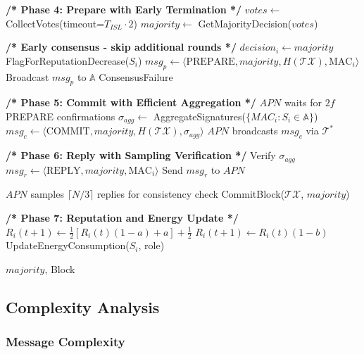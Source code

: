 \begin{algorithm}[H]
\begin{algorithmic}[1]
\Statex \textbf{/* Phase 4: Prepare with Early Termination */}
\State $votes \leftarrow$ CollectVotes(timeout=$T_{ISL} \cdot 2$)
\State $majority \leftarrow$ GetMajorityDecision($votes$)

    \State \textbf{/* Early consensus - skip additional rounds */}
            \State $decision_i \leftarrow majority$
            \State FlagForReputationDecrease($S_i$)
        \EndIf
        \State $msg_p \leftarrow \langle \text{PREPARE}, majority, H(\mathcal{TX}), \text{MAC}_i \rangle$
        \State Broadcast $msg_p$ to $\mathbb{A}$
    \EndFor
\Else
    \State \Return ConsensusFailure
\EndIf

\Statex \textbf{/* Phase 5: Commit with Efficient Aggregation */}
\State $APN$ waits for $2f$ PREPARE confirmations
\State $\sigma_{agg} \leftarrow$ AggregateSignatures($\{MAC_i : S_i \in \mathbb{A}\}$) 
\State $msg_c \leftarrow \langle \text{COMMIT}, majority, H(\mathcal{TX}), \sigma_{agg} \rangle$
\State $APN$ broadcasts $msg_c$ via $\mathcal{T}^*$

\Statex \textbf{/* Phase 6: Reply with Sampling Verification */}
    \State Verify $\sigma_{agg}$
    \State $msg_r \leftarrow \langle \text{REPLY}, majority, \text{MAC}_i \rangle$
    \State Send $msg_r$ to $APN$
\EndFor

\State $APN$ samples $\lceil N/3 \rceil$ replies for consistency check
    \State CommitBlock($\mathcal{TX}$, $majority$)
\EndIf

\Statex \textbf{/* Phase 7: Reputation and Energy Update */}
        \State $R_i(t+1) \leftarrow \frac{1}{2}[R_i(t)(1-a) + a] + \frac{1}{2}$
    \Else
        \State $R_i(t+1) \leftarrow R_i(t)(1-b)$ 
    \EndIf
    \State UpdateEnergyConsumption($S_i$, role)
\EndFor

\State \Return $majority$, Block
\end{algorithmic}
\end{algorithm}


\subsection{Complexity Analysis}

\subsubsection{Message Complexity}

